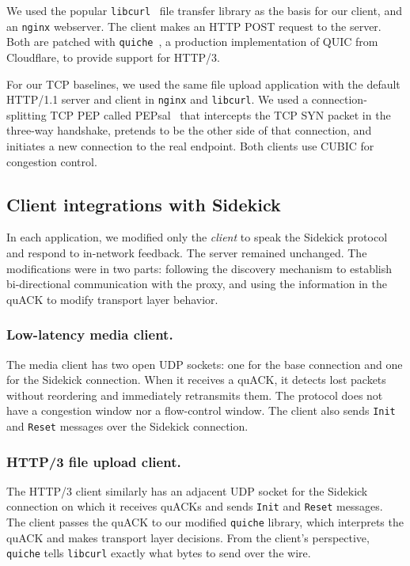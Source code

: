 We used the popular \texttt{libcurl}~\cite{libcurl} file transfer library as the
basis for our client, and an \texttt{nginx} webserver. The client makes an
HTTP POST request to the server. Both are patched with \texttt{quiche}~\cite
{quiche}, a production implementation of QUIC from Cloudflare, to
provide support for HTTP/3.

For our TCP baselines, we used the same file upload application with the
default HTTP/1.1 server and client in \texttt{nginx} and \texttt{libcurl}.
We used a connection-splitting TCP PEP called PEPsal~\cite{caini2006pepsal}
that intercepts the TCP
SYN packet in the three-way handshake, pretends to be the other side of that
connection, and initiates a new connection to the real endpoint.
Both clients use CUBIC for congestion control.

\subsection{Client integrations with Sidekick}
\label{sec:sidekick:implementation:client-integrations}

In each application, we modified only the \emph{client} to speak the Sidekick
protocol and respond to in-network feedback. The server remained unchanged.
The modifications were in two parts: following the discovery mechanism to
establish bi-directional communication with the proxy, and using the information
in the quACK to modify transport layer behavior.

\subsubsection{Low-latency media client.}

The media client has two open UDP sockets: one for the base connection and one
for the Sidekick connection. When it receives a quACK, it detects lost packets
without reordering and immediately retransmits them. The protocol does not have
a congestion window nor a flow-control window. The client also sends
\texttt{Init} and \texttt{Reset} messages over the Sidekick connection.

\subsubsection{HTTP/3 file upload client.}

The HTTP/3 client similarly has an adjacent UDP socket for the Sidekick
connection on which it receives quACKs and sends \texttt{Init} and \texttt{Reset}
messages. The client passes the quACK to our modified \texttt{quiche} library,
which interprets the quACK and makes transport layer decisions. From the
client's perspective, \texttt{quiche} tells \texttt{libcurl} exactly what bytes
to send over the wire.

